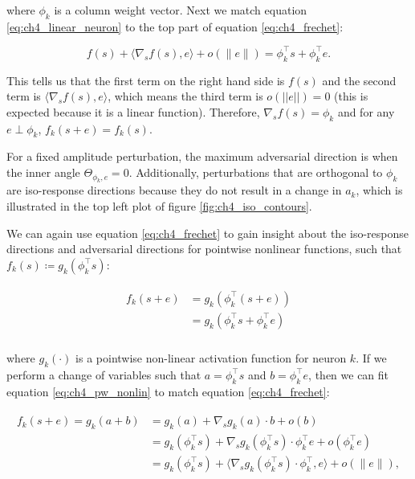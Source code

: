 where $\phi_{k}$ is a column weight vector. Next we match equation \eqref{eq:ch4_linear_neuron} to the top part of equation \eqref{eq:ch4_frechet}:

\begin{equation}
    f(s) + \langle\nabla_{s}f(s), e\rangle + o(\|e\|) = \phi_{k}^\top s + \phi_{k}^\top e.
\end{equation}

This tells us that the first term on the right hand side is $f(s)$ and the second term is $\langle\nabla_{s}f(s), e\rangle$, which means the third term is $o(||e||)=0$ (this is expected because it is a linear function). Therefore,  $\nabla_{s}f(s) = \phi_{k}$ and for any $e \perp \phi_{k}$, $f_{k}(s+e) = f_{k}(s)$.

For a fixed amplitude perturbation, the maximum adversarial direction is when the inner angle $\Theta_{\phi_{k},e} = 0$. Additionally, perturbations that are orthogonal to $\phi_{k}$ are iso-response directions because they do not result in a change in $a_{k}$, which is illustrated in the top left plot of figure \ref{fig:ch4_iso_contours}.

We can again use equation \eqref{eq:ch4_frechet} to gain insight about the iso-response directions and adversarial directions for pointwise nonlinear functions, such that $f_{k}(s) \coloneqq g_{k}(\phi_{k}^\top s)$:

\begin{align}\label{eq:ch4_pw_nonlin}
\begin{split}
  f_{k}(s+e) &= g_{k}(\phi_{k}^\top(s+e)) \\
  &=g_{k}(\phi_{k}^\top s + \phi_{k}^\top e) \\
\end{split}
\end{align}

where $g_{k}(\cdot)$ is a pointwise non-linear activation function for neuron $k$. If we perform a change of variables such that $a = \phi_{k}^\top s$ and $b = \phi_{k}^\top e$, then we can fit equation \eqref{eq:ch4_pw_nonlin} to match equation \eqref{eq:ch4_frechet}:

\begin{align}\label{eq:ch4_pw_nonlin_frechet}
\begin{split}
    f_{k}(s + e) = g_{k}(a + b) &= g_{k}(a) + \nabla_{s}g_{k}(a) \cdot b + o(b) \\
    &=g_{k}(\phi_{k}^\top s) + \nabla_{s}g_{k}(\phi_{k}^\top s) \cdot \phi_{k}^\top e + o(\phi_{k}^\top e)\\
    &=g_{k}(\phi_{k}^\top s) + \langle\nabla_{s}g_{k}(\phi_{k}^\top s) \cdot \phi_{k}^\top, e\rangle + o(\|e\|),
\end{split}
\end{align}

